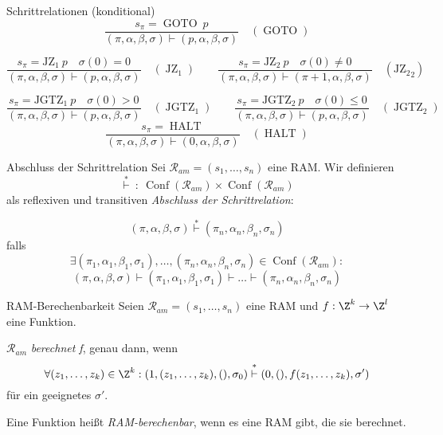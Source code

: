 \documentclass[german]{spicker}
\begin{document}
\begin{example}{Schrittrelationen (konditional)}
  $$
    \frac{s_\pi = \operatorname{GOTO} \ p}{(\pi, \alpha, \beta, \sigma) \vdash (p, \alpha, \beta, \sigma)} \quad (\operatorname{GOTO})
  $$

  $$
    \frac{s_\pi = \operatorname{JZ_1} \ p \quad \sigma(0) = 0}{(\pi, \alpha, \beta, \sigma) \vdash (p, \alpha, \beta, \sigma)} \quad (\operatorname{JZ}_1)
    \qquad
    \frac{s_\pi = \operatorname{JZ_2} \ p \quad \sigma(0) \neq 0}{(\pi, \alpha, \beta, \sigma) \vdash (\pi + 1, \alpha, \beta, \sigma)} \quad (\operatorname{JZ_2}_2)
  $$

  $$
    \frac{s_\pi = \operatorname{JGTZ_1} \ p \quad \sigma(0) > 0}{(\pi, \alpha, \beta, \sigma) \vdash (p, \alpha, \beta, \sigma)} \quad (\operatorname{JGTZ}_1)
    \qquad
    \frac{s_\pi = \operatorname{JGTZ_2} \ p \quad \sigma(0) \leq 0}{(\pi, \alpha, \beta, \sigma) \vdash (p, \alpha, \beta, \sigma)} \quad (\operatorname{JGTZ}_2)
  $$
  $$
    \frac{s_\pi = \operatorname{HALT}}{(\pi, \alpha, \beta, \sigma) \vdash (0, \alpha, \beta, \sigma)} \quad (\operatorname{HALT})
  $$
\end{example}

\begin{defi}{Abschluss der Schrittrelation}
  Sei $\mathcal{R}_{am} = (s_1, \ldots, s_n)$ eine RAM.
  Wir definieren
  $$
    \overset{*}{\vdash} \ : \ \operatorname{Conf} (\mathcal{R}_{am}) \times \operatorname{Conf} (\mathcal{R}_{am})
  $$
  als reflexiven und transitiven \emph{Abschluss der Schrittrelation}:

  $$
    \boxed{
      (\pi, \alpha, \beta, \sigma) \overset{*}{\vdash} (\pi_n, \alpha_n, \beta_n, \sigma_n)
    }
  $$
  falls
  $$
    \exists (\pi_1, \alpha_1, \beta_1, \sigma_1), \ldots, (\pi_n, \alpha_n, \beta_n, \sigma_n) \in \operatorname{Conf} (\mathcal{R}_{am}) :
  $$
  $$
    (\pi, \alpha, \beta, \sigma) \vdash (\pi_1, \alpha_1, \beta_1, \sigma_1) \vdash \ldots \vdash (\pi_n, \alpha_n, \beta_n, \sigma_n)
  $$
\end{defi}

\begin{defi}{RAM-Berechenbarkeit}
  Seien $\mathcal{R}_{am} = (s_1, \ldots, s_n)$ eine RAM und $f : \Z^k \to \Z^l$ eine Funktion.

  $\mathcal{R}_{am}$ \emph{berechnet f}, genau dann, wenn
  $$
    \forall (z_1, \ldots, z_k) \in \Z^k : (1, (z_1, \ldots, z_k), (), \sigma_0) \overset{*}{\vdash} (0, (), f(z_1, \ldots, z_k), \sigma')
  $$
  für ein geeignetes $\sigma'$.

  Eine Funktion heißt \emph{RAM-berechenbar}, wenn es eine RAM gibt, die sie berechnet.
\end{defi}
\end{document}
